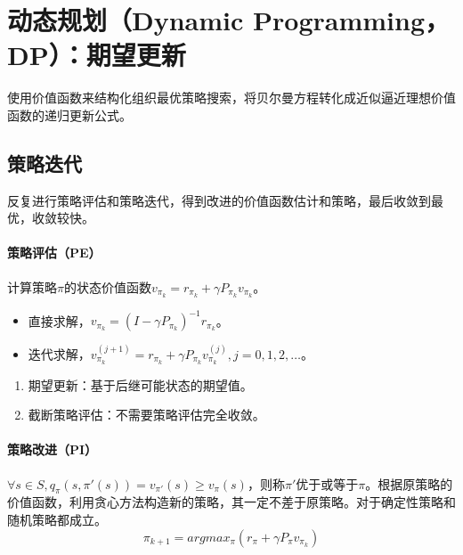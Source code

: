 \documentclass[
12pt, %
a4paper, 
oneside, %
headinclude,footinclude, %
]{scrartcl}
\begin{document}
\section{动态规划（Dynamic Programming，DP）：期望更新}
使用价值函数来结构化组织最优策略搜索，将贝尔曼方程转化成近似逼近理想价值函数的递归更新公式。
\subsection{策略迭代}
反复进行策略评估和策略迭代，得到改进的价值函数估计和策略，最后收敛到最优，收敛较快。
\paragraph{策略评估（PE）}
计算策略$ \pi $的状态价值函数$ v_{\pi_k} = r_{\pi_k} + \gamma P_{\pi_k}v_{\pi_k} $。
\begin{itemize}
\item 直接求解，$ v_{\pi_k} = (I - \gamma P_{\pi_k})^{-1} r_{\pi_k} $。
\item 迭代求解，$ v_{\pi_k}^{(j + 1)} = r_{\pi_k} + \gamma P_{\pi_k} v_{\pi_k}^{(j)}, j = 0, 1, 2, \dots $。
\end{itemize}
\begin{enumerate}
\item 期望更新：基于后继可能状态的期望值。
\item 截断策略评估：不需要策略评估完全收敛。
\end{enumerate}
\paragraph{策略改进（PI）}
$ \forall s \in S, q_{\pi}(s, \pi'(s)) = v_{\pi'}(s) \geq v_{\pi}(s) $，则称$ \pi' $优于或等于$ \pi $。根据原策略的价值函数，利用贪心方法构造新的策略，其一定不差于原策略。对于确定性策略和随机策略都成立。
$$ \pi_{k + 1} = argmax_{\pi}(r_{\pi} + \gamma P_{\pi}v_{\pi_k}) $$
\end{document}
